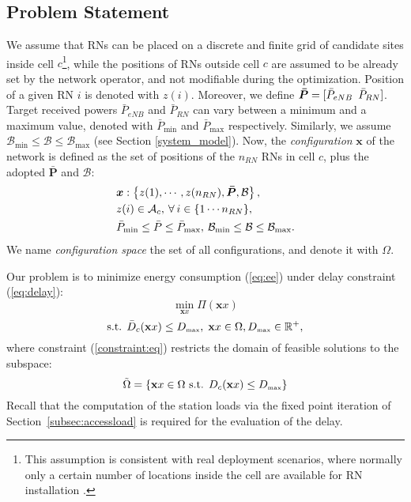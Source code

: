 \documentclass[draftcls,onecolumn]{IEEEtran}
\theoremstyle{plain}
\theoremstyle{definition}
\def\config{\mathbf{x}}
\def\objective{{\Pi}} \def\constraint{{\cal D}}
\def\constraintmax{D_{\mbox{{\tiny max}}}}
\def\feasable{\tilde{\Omega}}
\def\objective{{\Pi}} \def\constraint{D_c} \def\constraintmax{D_{\mbox{{\tiny max}}}}
\def\feasable{\tilde{\Omega}}
\def\st{\mbox{ s.t. }} \def\ie{\mbox{\em i.e., }} \def\wrt{\mbox{\em wrt. }}
\def\st{\mbox{ s.t. }} \def\ie{\mbox{\em i.e., }}
\begin{document}
\subsection{Problem Statement}
We assume that RNs can be placed on a discrete and finite grid of candidate sites inside cell $c$\footnote{This assumption is consistent with real deployment scenarios, where normally only a certain number of locations inside the cell are available for RN installation \cite{bulakciRSP}.}, while the positions of RNs outside cell $c$ are assumed to be already set by the network operator, and not modifiable during the optimization. Position of a given RN $i$ is denoted with $z(i)$. 
Moreover, we define $\boldsymbol{\bar{P}}=[\bar{P}_{eNB} \hspace{5 pt}\bar{P}_{RN}]$.
Target received powers $\bar{P}_{eNB}$ and $\bar{P}_{RN}$ can vary between a minimum and a maximum value, denoted with $\bar{P}_{\min}$ and $\bar{P}_{\max}$ respectively. Similarly, we assume $\mathcal{B}_{\min} \leq  \mathcal{B} \leq \mathcal{B}_{\max}$ (see Section \ref{system_model}).
Now, the {\it configuration} $\boldsymbol{x}$ of the network is defined as the set of positions of the $n_{RN}$ RNs in cell $c$, plus the adopted $\boldsymbol{\bar{P}}$ and $\mathcal{B}$:
\begin{align}
  & \boldsymbol{x} : \left\{  z(1), \cdots ,z(n_{RN}), \boldsymbol{\bar{P}}, \mathcal{B}  \right\}, \notag \\
  & z(i)\in \mathcal{A}_{c}, \hspace{2 pt} \forall \hspace{2 pt}i \in \{1\cdots n_{RN}\}, \notag \\
  & \bar{P}_{\min}\leq \bar{P} \leq \bar{P}_{\max}, \hspace{2 pt} \mathcal{B}_{\min} \leq  \mathcal{B} \leq \mathcal{B}_{\max}.
\end{align}
We name {\it configuration space} the set of all configurations, and denote it with $\Omega$.

Our problem is to minimize energy consumption (\ref{eq:ee}) under delay constraint (\ref{eq:delay}):
\begin{equation}
\min_{\config{x}} \objective(\config{x}) \label{objective:eq} 
\end{equation}
\begin{equation}
\mbox{s.t. } \bar{D}_c(\config{x}) \leq \constraintmax,\; \config{x} \in \Omega, \constraintmax \in \mathbb{R}^+, \label{constraint:eq}
\end{equation}
where constraint (\ref{constraint:eq}) restricts the domain of feasible solutions to the subspace: 
\begin{equation}
\feasable = \{ \config{x} \in \Omega \st \constraint(\config{x}) \leq \constraintmax \} 
\end{equation}
Recall that the computation of the station loads via the fixed point iteration of Section~\ref{subsec:accessload} is required for the evaluation of the delay.
\end{document}
